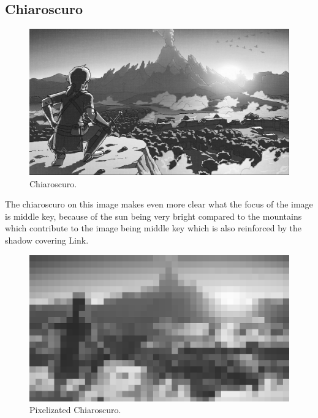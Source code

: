 \documentclass{cup-pan}
\begin{document}
        \subsection{Chiaroscuro}
            \begin{figure}[H]
                \includegraphics[width=\textwidth]{Imagenes/Referencias/Analisis_ConceptArt/claroscuro.png}
                \caption{Chiaroscuro.}
            \end{figure}

            The chiaroscuro on this image makes even more clear what the focus of the image is middle key, because of the sun being very bright compared to the mountains which contribute to the image being middle key which is also reinforced by the shadow covering Link.\\
            \begin{figure}[H]
                \includegraphics[width=\textwidth]{Imagenes/Referencias/Analisis_ConceptArt/pixel.png}
                \caption{Pixelizated Chiaroscuro.}
            \end{figure}
\end{document}
